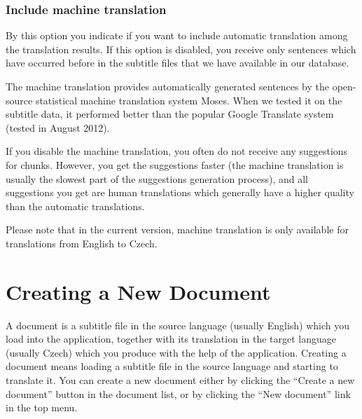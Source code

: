 \subsubsection{Include machine translation}

By this option you indicate if you want to include automatic translation among the translation results. If this option is disabled, you receive only sentences which have occurred before in the subtitle files that we have available in our database.

The machine translation provides automatically generated sentences by the open-source statistical machine translation system Moses. When we tested it on the subtitle data, it performed better than the popular Google Translate system (tested in August 2012).

If you disable the machine translation, you often do not receive any suggestions for chunks. However, you get the suggestions faster (the machine translation is usually the slowest part of the suggestions generation process), and all suggestions you get are human translations which generally have a higher quality than the automatic translations.

Please note that in the current version, machine translation is only available for translations from English to Czech.

\section{Creating a New Document}
\label{um:sec:doccreation}

A document is a subtitle file in the source language (usually English) which you load into the application, together with its translation in the target language (usually Czech) which you produce with the help of the application. Creating a document means loading a subtitle file in the source language and starting to translate it. You can create a new document either by clicking the ``Create a new document'' button in the document list, or by clicking the ``New document'' link in the top menu.

